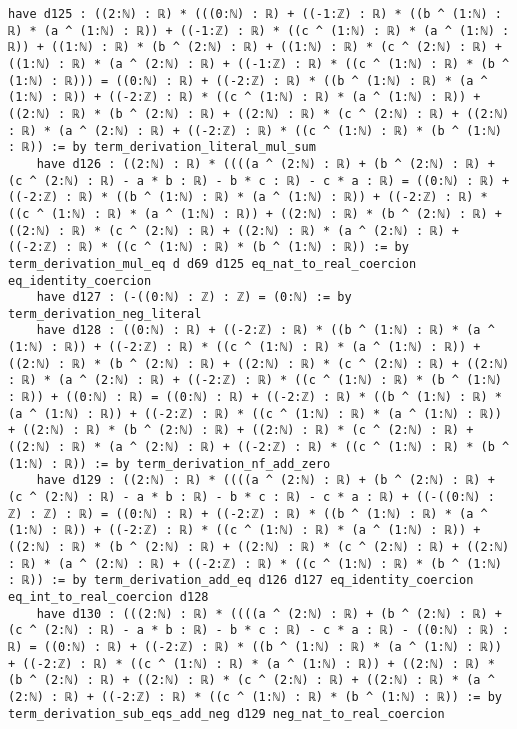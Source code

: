 \documentclass{article}
\begin{document}
\begin{tcolorbox}[colback=white!10, width=\linewidth]
\begin{lstlisting}[language=Lean4]
    have d125 : ((2:ℕ) : ℝ) * (((0:ℕ) : ℝ) + ((-1:ℤ) : ℝ) * ((b ^ (1:ℕ) : ℝ) * (a ^ (1:ℕ) : ℝ)) + ((-1:ℤ) : ℝ) * ((c ^ (1:ℕ) : ℝ) * (a ^ (1:ℕ) : ℝ)) + ((1:ℕ) : ℝ) * (b ^ (2:ℕ) : ℝ) + ((1:ℕ) : ℝ) * (c ^ (2:ℕ) : ℝ) + ((1:ℕ) : ℝ) * (a ^ (2:ℕ) : ℝ) + ((-1:ℤ) : ℝ) * ((c ^ (1:ℕ) : ℝ) * (b ^ (1:ℕ) : ℝ))) = ((0:ℕ) : ℝ) + ((-2:ℤ) : ℝ) * ((b ^ (1:ℕ) : ℝ) * (a ^ (1:ℕ) : ℝ)) + ((-2:ℤ) : ℝ) * ((c ^ (1:ℕ) : ℝ) * (a ^ (1:ℕ) : ℝ)) + ((2:ℕ) : ℝ) * (b ^ (2:ℕ) : ℝ) + ((2:ℕ) : ℝ) * (c ^ (2:ℕ) : ℝ) + ((2:ℕ) : ℝ) * (a ^ (2:ℕ) : ℝ) + ((-2:ℤ) : ℝ) * ((c ^ (1:ℕ) : ℝ) * (b ^ (1:ℕ) : ℝ)) := by term_derivation_literal_mul_sum
    have d126 : ((2:ℕ) : ℝ) * ((((a ^ (2:ℕ) : ℝ) + (b ^ (2:ℕ) : ℝ) + (c ^ (2:ℕ) : ℝ) - a * b : ℝ) - b * c : ℝ) - c * a : ℝ) = ((0:ℕ) : ℝ) + ((-2:ℤ) : ℝ) * ((b ^ (1:ℕ) : ℝ) * (a ^ (1:ℕ) : ℝ)) + ((-2:ℤ) : ℝ) * ((c ^ (1:ℕ) : ℝ) * (a ^ (1:ℕ) : ℝ)) + ((2:ℕ) : ℝ) * (b ^ (2:ℕ) : ℝ) + ((2:ℕ) : ℝ) * (c ^ (2:ℕ) : ℝ) + ((2:ℕ) : ℝ) * (a ^ (2:ℕ) : ℝ) + ((-2:ℤ) : ℝ) * ((c ^ (1:ℕ) : ℝ) * (b ^ (1:ℕ) : ℝ)) := by term_derivation_mul_eq d d69 d125 eq_nat_to_real_coercion eq_identity_coercion
    have d127 : (-((0:ℕ) : ℤ) : ℤ) = (0:ℕ) := by term_derivation_neg_literal
    have d128 : ((0:ℕ) : ℝ) + ((-2:ℤ) : ℝ) * ((b ^ (1:ℕ) : ℝ) * (a ^ (1:ℕ) : ℝ)) + ((-2:ℤ) : ℝ) * ((c ^ (1:ℕ) : ℝ) * (a ^ (1:ℕ) : ℝ)) + ((2:ℕ) : ℝ) * (b ^ (2:ℕ) : ℝ) + ((2:ℕ) : ℝ) * (c ^ (2:ℕ) : ℝ) + ((2:ℕ) : ℝ) * (a ^ (2:ℕ) : ℝ) + ((-2:ℤ) : ℝ) * ((c ^ (1:ℕ) : ℝ) * (b ^ (1:ℕ) : ℝ)) + ((0:ℕ) : ℝ) = ((0:ℕ) : ℝ) + ((-2:ℤ) : ℝ) * ((b ^ (1:ℕ) : ℝ) * (a ^ (1:ℕ) : ℝ)) + ((-2:ℤ) : ℝ) * ((c ^ (1:ℕ) : ℝ) * (a ^ (1:ℕ) : ℝ)) + ((2:ℕ) : ℝ) * (b ^ (2:ℕ) : ℝ) + ((2:ℕ) : ℝ) * (c ^ (2:ℕ) : ℝ) + ((2:ℕ) : ℝ) * (a ^ (2:ℕ) : ℝ) + ((-2:ℤ) : ℝ) * ((c ^ (1:ℕ) : ℝ) * (b ^ (1:ℕ) : ℝ)) := by term_derivation_nf_add_zero
    have d129 : ((2:ℕ) : ℝ) * ((((a ^ (2:ℕ) : ℝ) + (b ^ (2:ℕ) : ℝ) + (c ^ (2:ℕ) : ℝ) - a * b : ℝ) - b * c : ℝ) - c * a : ℝ) + ((-((0:ℕ) : ℤ) : ℤ) : ℝ) = ((0:ℕ) : ℝ) + ((-2:ℤ) : ℝ) * ((b ^ (1:ℕ) : ℝ) * (a ^ (1:ℕ) : ℝ)) + ((-2:ℤ) : ℝ) * ((c ^ (1:ℕ) : ℝ) * (a ^ (1:ℕ) : ℝ)) + ((2:ℕ) : ℝ) * (b ^ (2:ℕ) : ℝ) + ((2:ℕ) : ℝ) * (c ^ (2:ℕ) : ℝ) + ((2:ℕ) : ℝ) * (a ^ (2:ℕ) : ℝ) + ((-2:ℤ) : ℝ) * ((c ^ (1:ℕ) : ℝ) * (b ^ (1:ℕ) : ℝ)) := by term_derivation_add_eq d126 d127 eq_identity_coercion eq_int_to_real_coercion d128
    have d130 : (((2:ℕ) : ℝ) * ((((a ^ (2:ℕ) : ℝ) + (b ^ (2:ℕ) : ℝ) + (c ^ (2:ℕ) : ℝ) - a * b : ℝ) - b * c : ℝ) - c * a : ℝ) - ((0:ℕ) : ℝ) : ℝ) = ((0:ℕ) : ℝ) + ((-2:ℤ) : ℝ) * ((b ^ (1:ℕ) : ℝ) * (a ^ (1:ℕ) : ℝ)) + ((-2:ℤ) : ℝ) * ((c ^ (1:ℕ) : ℝ) * (a ^ (1:ℕ) : ℝ)) + ((2:ℕ) : ℝ) * (b ^ (2:ℕ) : ℝ) + ((2:ℕ) : ℝ) * (c ^ (2:ℕ) : ℝ) + ((2:ℕ) : ℝ) * (a ^ (2:ℕ) : ℝ) + ((-2:ℤ) : ℝ) * ((c ^ (1:ℕ) : ℝ) * (b ^ (1:ℕ) : ℝ)) := by term_derivation_sub_eqs_add_neg d129 neg_nat_to_real_coercion

\end{lstlisting}
\end{tcolorbox}
\end{document}
